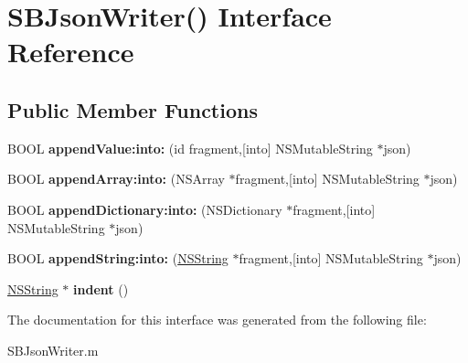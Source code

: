 \hypertarget{interface_s_b_json_writer_07_08}{
\section{\-S\-B\-Json\-Writer() \-Interface \-Reference}
\label{interface_s_b_json_writer_07_08}
}
\subsection*{\-Public \-Member \-Functions}
\begin{DoxyCompactItemize}
\item 
\hypertarget{interface_s_b_json_writer_07_08_a4364dcbbe231d0fcd36e12efaf107f51}{
\-B\-O\-O\-L {\bfseries append\-Value\-:into\-:} (id fragment,\mbox{[}into\mbox{]} \-N\-S\-Mutable\-String $\ast$json)}
\label{interface_s_b_json_writer_07_08_a4364dcbbe231d0fcd36e12efaf107f51}

\item 
\hypertarget{interface_s_b_json_writer_07_08_a5d28358c936d8c3325add8b9cf9c11f2}{
\-B\-O\-O\-L {\bfseries append\-Array\-:into\-:} (\-N\-S\-Array $\ast$fragment,\mbox{[}into\mbox{]} \-N\-S\-Mutable\-String $\ast$json)}
\label{interface_s_b_json_writer_07_08_a5d28358c936d8c3325add8b9cf9c11f2}

\item 
\hypertarget{interface_s_b_json_writer_07_08_ae7b697af01ff6197a5bf1f1cc5eba887}{
\-B\-O\-O\-L {\bfseries append\-Dictionary\-:into\-:} (\-N\-S\-Dictionary $\ast$fragment,\mbox{[}into\mbox{]} \-N\-S\-Mutable\-String $\ast$json)}
\label{interface_s_b_json_writer_07_08_ae7b697af01ff6197a5bf1f1cc5eba887}

\item 
\hypertarget{interface_s_b_json_writer_07_08_aa3803962660a20ecec9f100bbd393ff6}{
\-B\-O\-O\-L {\bfseries append\-String\-:into\-:} (\hyperlink{class_n_s_string}{\-N\-S\-String} $\ast$fragment,\mbox{[}into\mbox{]} \-N\-S\-Mutable\-String $\ast$json)}
\label{interface_s_b_json_writer_07_08_aa3803962660a20ecec9f100bbd393ff6}

\item 
\hypertarget{interface_s_b_json_writer_07_08_aff5108b4c65eb132d710db30ca1a3d03}{
\hyperlink{class_n_s_string}{\-N\-S\-String} $\ast$ {\bfseries indent} ()}
\label{interface_s_b_json_writer_07_08_aff5108b4c65eb132d710db30ca1a3d03}

\end{DoxyCompactItemize}


\-The documentation for this interface was generated from the following file\-:\begin{DoxyCompactItemize}
\item 
\-S\-B\-Json\-Writer.\-m\end{DoxyCompactItemize}
